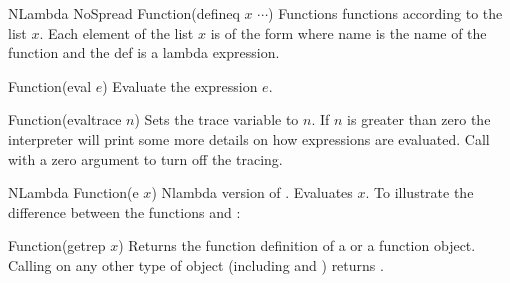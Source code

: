 \begin{defun}{NLambda NoSpread Function}{(defineq $x$ $\cdots$)}
  Functions functions according to the list $x$. Each element of the
  list $x$ is of the form  where name is the name of
  the function and the def is a lambda expression.

\end{defun}

\begin{defun}{Function}{(eval $e$)}
  Evaluate the expression $e$.
\end{defun}

\begin{defun}{Function}{(evaltrace $n$)}
  Sets the trace variable to $n$. If $n$ is greater than zero the
  interpreter will print some more details on how expressions are
  evaluated. Call  with a zero argument to turn off
  the tracing.
\end{defun}

\begin{defun}{NLambda Function}{(e $x$)}
  Nlambda version of . Evaluates $x$. To illustrate the
  difference between the functions  and :

  \begin{examples}
  \end{examples}

\end{defun}

\begin{defun}{Function}{(getrep $x$)}
  Returns the function definition of a  or a
   function object. Calling  on any other
  type of object (including  and ) returns
  \NIL.

  \begin{examples}
  \end{examples}

\end{defun}


